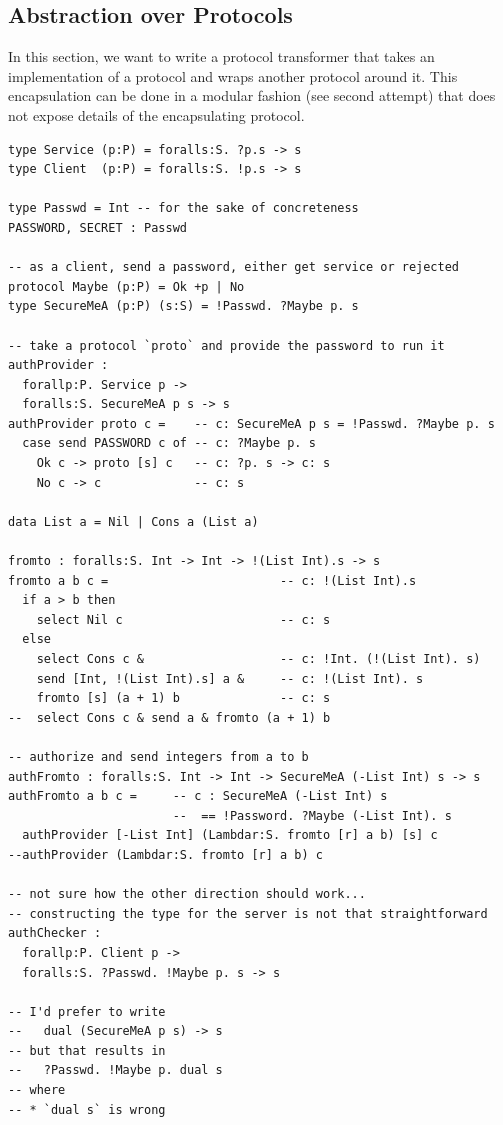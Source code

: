 \subsection{Abstraction over Protocols}
\label{sec:abstr-over-prot}

In this section, we want to write a protocol transformer that takes an
implementation of a protocol and wraps another protocol around
it. This encapsulation can be done in a modular fashion (see second
attempt) that does not expose details of the encapsulating protocol.

\begin{lstlisting}
type Service (p:P) = foralls:S. ?p.s -> s
type Client  (p:P) = foralls:S. !p.s -> s

type Passwd = Int -- for the sake of concreteness
PASSWORD, SECRET : Passwd

-- as a client, send a password, either get service or rejected
protocol Maybe (p:P) = Ok +p | No
type SecureMeA (p:P) (s:S) = !Passwd. ?Maybe p. s

-- take a protocol `proto` and provide the password to run it
authProvider : 
  forallp:P. Service p -> 
  foralls:S. SecureMeA p s -> s 
authProvider proto c =    -- c: SecureMeA p s = !Passwd. ?Maybe p. s
  case send PASSWORD c of -- c: ?Maybe p. s
    Ok c -> proto [s] c   -- c: ?p. s -> c: s
    No c -> c             -- c: s

data List a = Nil | Cons a (List a)

fromto : foralls:S. Int -> Int -> !(List Int).s -> s
fromto a b c =                        -- c: !(List Int).s
  if a > b then
    select Nil c                      -- c: s
  else
    select Cons c &                   -- c: !Int. (!(List Int). s)
    send [Int, !(List Int).s] a &     -- c: !(List Int). s
    fromto [s] (a + 1) b              -- c: s
--  select Cons c & send a & fromto (a + 1) b

-- authorize and send integers from a to b
authFromto : foralls:S. Int -> Int -> SecureMeA (-List Int) s -> s
authFromto a b c =     -- c : SecureMeA (-List Int) s
                       --  == !Password. ?Maybe (-List Int). s
  authProvider [-List Int] (Lambdar:S. fromto [r] a b) [s] c
--authProvider (Lambdar:S. fromto [r] a b) c

-- not sure how the other direction should work...
-- constructing the type for the server is not that straightforward
authChecker : 
  forallp:P. Client p ->
  foralls:S. ?Passwd. !Maybe p. s -> s

-- I'd prefer to write
--   dual (SecureMeA p s) -> s
-- but that results in
--   ?Passwd. !Maybe p. dual s
-- where
-- * `dual s` is wrong


\end{lstlisting}

